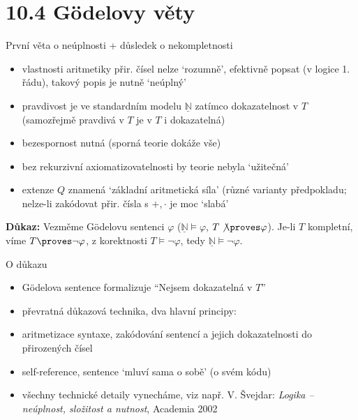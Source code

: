 \documentclass{beamer}
\begin{document}
\section{10.4 Gödelovy věty}


\begin{frame}{První věta o neúplnosti + důsledek o nekompletnosti}

    \pause

    \pause
    \begin{itemize}
        \item vlastnosti aritmetiky přir. čísel nelze `rozumně', efektivně popsat (v logice 1. řádu), takový popis je nutně `neúplný'\pause
        \item \alert{pravdivost} je ve standardním modelu $\underline{\mathbb N}$ zatímco \alert{dokazatelnost} v $T$ (samozřejmě pravdivá v $T$ je v $T$ i dokazatelná)\pause
        \item \alert{bezespornost} nutná (sporná teorie dokáže vše)\pause
        \item bez \alert{rekurzivní axiomatizovatelnosti} by teorie nebyla `užitečná'\pause
        \item extenze $Q$ znamená `základní aritmetická síla' (různé varianty předpokladu; nelze-li zakódovat přir. čísla s $+,\cdot$ je moc `slabá'
    \end{itemize}    

    \pause
    
    \pause
    \textbf{Důkaz:}
        Vezměme Gödelovu sentenci $\varphi$ ($\underline{\mathbb N}\models\varphi$, $T\not\proves\varphi$). Je-li $T$ kompletní, víme $T\proves\neg\varphi$, z korektnosti $T\models\neg\varphi$, tedy $\underline{\mathbb N}\models\neg\varphi$.
    \hfill\qedsymbol    

\end{frame}


\begin{frame}{O důkazu}

    \begin{itemize}[<+->]
        \item Gödelova sentence formalizuje \alert{``Nejsem dokazatelná v $T$''}
        \item převratná důkazová technika, dva hlavní principy:
        \item \alert{aritmetizace syntaxe}, zakódování sentencí a jejich dokazatelnosti do přirozených čísel
        \item \alert{self-reference}, sentence `mluví sama o sobě' (o svém kódu)
        \item všechny technické detaily vynecháme, viz např. V. Švejdar: \emph{Logika -- neúplnost, složitost a nutnost}, Academia 2002
    \end{itemize}
    
\end{frame}
\end{document}
